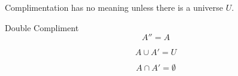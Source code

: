 \documentclass[20150903-160354-rs2.2-MarksMathNotebook.tex]{subfiles}
\begin{document}
\begin{remark}
Complimentation has no meaning unless there is a universe $U$.
\end{remark}

\begin{property}{Double Compliment}
\[
A''=A
\]
\end{property}

\begin{property}
\[
A \cup A' = U
\]
\end{property}

\begin{property}
\[
A \cap A' = \emptyset
\]
\end{property}
\end{document}
